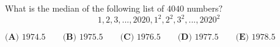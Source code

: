 What is the median of the following list of $4040$ numbers$?$
\[1, 2, 3, ..., 2020, 1^2, 2^2, 3^2, ..., 2020^2\]

$\textbf{(A) } 1974.5 \qquad \textbf{(B) } 1975.5 \qquad \textbf{(C) } 1976.5 \qquad \textbf{(D) } 1977.5 \qquad \textbf{(E) } 1978.5$